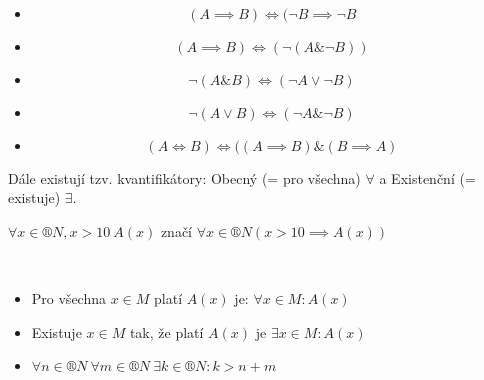 \documentclass[12pt]{article}					%
\begin{document}
\begin{poznamka}
            \begin{prikladin}
                \ 
                \begin{itemize}
                    \item $$ (A \implies B) \Leftrightarrow (\neg B \implies \neg B $$
                    \item $$ (A \implies B) \Leftrightarrow (\neg (A \& \neg B)) $$ 
                    \item $$ \neg (A \& B) \Leftrightarrow (\neg A \lor \neg B) $$
                    \item $$ \neg (A \lor B) \Leftrightarrow (\neg A \& \neg B) $$                    
                    \item $$ (A \Leftrightarrow B) \Leftrightarrow ((A \implies B) \& (B \implies A) $$ 
                \end{itemize}
            \end{prikladin}
        \end{poznamka}
        \begin{definice}[Kvantifikátory]
            Dále existují tzv. kvantifikátory: Obecný (= pro všechna) $\forall$ a Existenční (= existuje) $\exists$.
        \end{definice}
            
        \begin{umluva}
            $\forall x \in ®N, x>10 \ A(x)$ značí  $\forall x \in ®N (x>10 \implies A(x))$
        \end{umluva}
        \begin{priklady}
            \ 
            \begin{itemize}
                \item Pro všechna $x \in M$ platí $A(x)$ je: $\forall x \in M: A(x)$ 
                \item Existuje $x \in M$ tak, že platí $A(x)$ je $\exists x \in M: A(x)$
                \item $ \forall n \in ®N\ \forall m \in ®N\ \exists k \in ®N: k> n+m $
            \end{itemize}
        \end{priklady}
\end{document}
